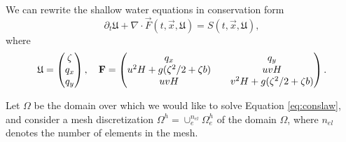 We can rewrite the shallow water equations in conservation form
\begin{equation}
\partial_t \mathfrak{U} + \nabla \cdot\vec{F}(t,\vec{x}, \mathfrak{U}) = S(t,\vec{x},\mathfrak{U}),
\label{eq:conslaw}
\end{equation}
where
\begin{equation*}
\mathfrak{U} = \begin{pmatrix} \zeta \\ q_x \\ q_y \end{pmatrix}, \quad {\bf F} = \begin{pmatrix} q_x && q_y \\ u^2H + g(\zeta^2/2 + \zeta b) && uv H \\
uv H && v^2 H + g ( \zeta^2 /2 + \zeta b) \end{pmatrix}.
\end{equation*}

Let $\Omega$ be the domain over which we would like to solve Equation \eqref{eq:conslaw}, and consider a mesh discretization $\Omega^h = \cup_e^{n_{el}} \Omega_e^h$ of the domain $\Omega$, where $n_{el}$ denotes the number of elements in the mesh.

